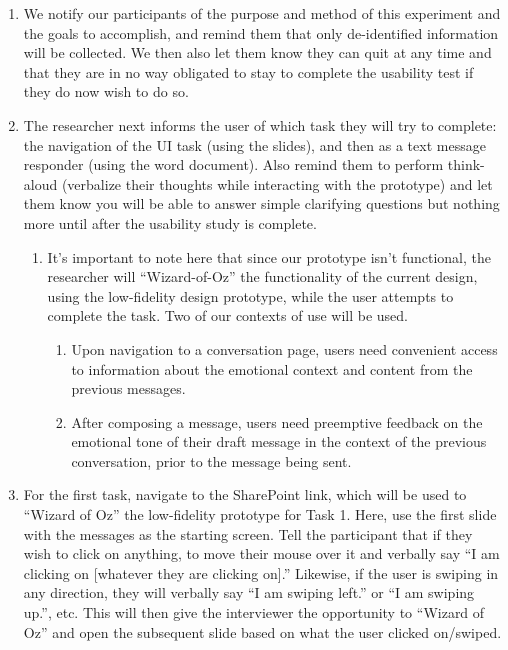 \documentclass[acmsmall,screen,authorversion,nonacm]{acmart}
\begin{document}
\begin{enumerate}
    \item We notify our participants of the purpose and method of this experiment and the goals to accomplish, and remind them that only de-identified information will be collected. We then also let them know they can quit at any time and that they are in no way obligated to stay to complete the usability test if they do now wish to do so.
    \item The researcher next informs the user of which task they will try to complete: the navigation of the UI task (using the slides), and then as a text message responder (using the word document). Also remind them to perform think-aloud (verbalize their thoughts while interacting with the prototype) and let them know you will be able to answer simple clarifying questions but nothing more until after the usability study is complete. 
    \begin{enumerate}[a]
        \item It’s important to note here that since our prototype isn’t functional, the researcher will “Wizard-of-Oz” the functionality of the current design, using the low-fidelity design prototype, while the user attempts to complete the task. Two of our contexts of use will be used.
        \begin{enumerate}[i]
            \item Upon navigation to a conversation page, users need convenient access to information about the emotional context and content from the previous messages.
            \item After composing a message, users need preemptive feedback on the emotional tone of their draft message in the context of the previous conversation, prior to the message being sent.
        \end{enumerate} 
    \end{enumerate}
    \item For the first task, navigate to the SharePoint link, which will be used to “Wizard of Oz” the low-fidelity prototype for Task 1. Here, use the first slide with the messages as the starting screen. Tell the participant that if they wish to click on anything, to move their mouse over it and verbally say “I am clicking on [whatever they are clicking on].” Likewise, if the user is swiping in any direction, they will verbally say “I am swiping left.” or “I am swiping up.”, etc. This will then give the interviewer the opportunity to “Wizard of Oz” and open the subsequent slide based on what the user clicked on/swiped.

\end{enumerate}
\end{document}
